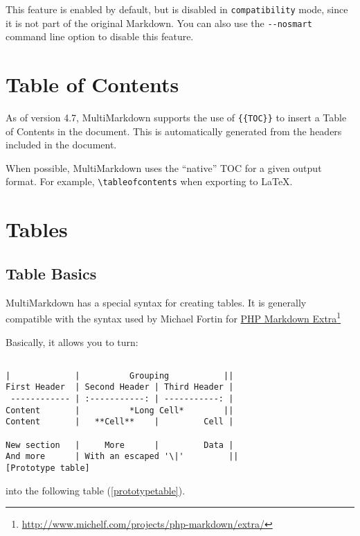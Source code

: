 This feature is enabled by default, but is disabled in \texttt{compatibility} mode, since it is not part of the original Markdown. You can also use the \texttt{-{}-nosmart} command line option to disable this feature.

\section{Table of Contents}
\label{tableofcontents}

As of version 4.7, MultiMarkdown supports the use of \texttt{\{\{TOC\}\}} to insert a Table of Contents in the document. This is automatically generated from the headers included in the document.

When possible, MultiMarkdown uses the ``native'' TOC for a given output format. For example, \texttt{\textbackslash{}tableofcontents} when exporting to LaTeX.

\section{Tables}
\label{tables}

\subsection{Table Basics}
\label{tablebasics}

MultiMarkdown has a special syntax for creating tables. It is generally compatible with the syntax used by Michael Fortin for \href{http://www.michelf.com/projects/php-markdown/extra/}{PHP Markdown Extra}\footnote{\href{http://www.michelf.com/projects/php-markdown/extra/}{http:\slash \slash www.michelf.com\slash projects\slash php-markdown\slash extra\slash }}

Basically, it allows you to turn:

\begin{verbatim}

|             |          Grouping           ||
First Header  | Second Header | Third Header |
 ------------ | :-----------: | -----------: |
Content       |          *Long Cell*        ||
Content       |   **Cell**    |         Cell |

New section   |     More      |         Data |
And more      | With an escaped '\|'         ||  
[Prototype table]

\end{verbatim}

into the following table (\autoref{prototypetable}).

